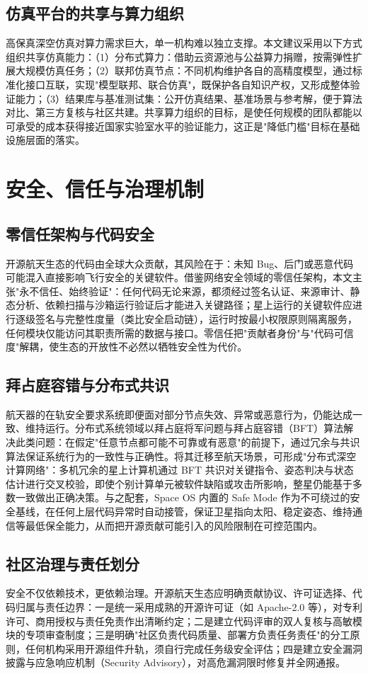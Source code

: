 \documentclass[UTF8,a4paper,zihao=-4]{ctexart}
\begin{document}
\subsection{仿真平台的共享与算力组织}
高保真深空仿真对算力需求巨大，单一机构难以独立支撑。本文建议采用以下方式组织共享仿真能力：（1）分布式算力：借助云资源池与公益算力捐赠，按需弹性扩展大规模仿真任务；（2）联邦仿真节点：不同机构维护各自的高精度模型，通过标准化接口互联，实现"模型联邦、联合仿真"，既保护各自知识产权，又形成整体验证能力；（3）结果库与基准测试集：公开仿真结果、基准场景与参考解，便于算法对比、第三方复核与社区共建。共享算力组织的目标，是使任何规模的团队都能以可承受的成本获得接近国家实验室水平的验证能力，这正是"降低门槛"目标在基础设施层面的落实。

\section{安全、信任与治理机制}
\subsection{零信任架构与代码安全}
开源航天生态的代码由全球大众贡献，其风险在于：未知 Bug、后门或恶意代码可能混入直接影响飞行安全的关键软件。借鉴网络安全领域的零信任架构，本文主张"永不信任、始终验证"：任何代码无论来源，都须经过签名认证、来源审计、静态分析、依赖扫描与沙箱运行验证后才能进入关键路径；星上运行的关键软件应进行逐级签名与完整性度量（类比安全启动链），运行时按最小权限原则隔离服务，任何模块仅能访问其职责所需的数据与接口。零信任把"贡献者身份"与"代码可信度"解耦，使生态的开放性不必然以牺牲安全性为代价。

\subsection{拜占庭容错与分布式共识}
航天器的在轨安全要求系统即便面对部分节点失效、异常或恶意行为，仍能达成一致、维持运行。分布式系统领域以拜占庭将军问题与拜占庭容错（BFT）算法解决此类问题：在假定"任意节点都可能不可靠或有恶意"的前提下，通过冗余与共识算法保证系统行为的一致性与正确性。将其迁移至航天场景，可形成"分布式深空计算网络"：多机冗余的星上计算机通过 BFT 共识对关键指令、姿态判决与状态估计进行交叉校验，即使个别计算单元被软件缺陷或攻击所影响，整星仍能基于多数一致做出正确决策。与之配套，Space OS 内置的 Safe Mode 作为不可绕过的安全基线，在任何上层代码异常时自动接管，保证卫星指向太阳、稳定姿态、维持通信等最低保全能力，从而把开源贡献可能引入的风险限制在可控范围内。

\subsection{社区治理与责任划分}
安全不仅依赖技术，更依赖治理。开源航天生态应明确贡献协议、许可证选择、代码归属与责任边界：一是统一采用成熟的开源许可证（如 Apache-2.0 等），对专利许可、商用授权与责任免责作出清晰约定；二是建立代码评审的双人复核与高敏模块的专项审查制度；三是明确"社区负责代码质量、部署方负责任务责任"的分工原则，任何机构采用开源组件升轨，须自行完成任务级安全评估；四是建立安全漏洞披露与应急响应机制（Security Advisory），对高危漏洞限时修复并全网通报。
\end{document}
